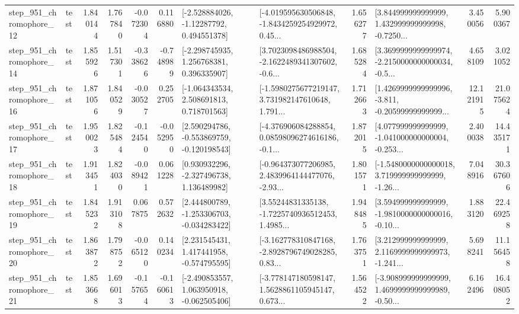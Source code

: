 \begin{tabular}{llrrrrllrlrr}
  step\_951\_chromophore\_12 &      test &      1.840144 &    1.767840 &     -0.072304 &  0.116880 &    [-2.528884026, -1.12287792, 0.494551378] &  [-4.019595630506848, -1.8434259254929972, 0.45... &       1.656277 &  [3.844999999999999, 1.432999999999998, -0.7250... &            3.450056 &          5.900367 \\
  step\_951\_chromophore\_14 &      test &      1.855926 &    1.517301 &     -0.338626 & -0.748989 &    [-2.298745935, 1.256768381, 0.396335907] &  [3.7023098486988504, -2.1622489341307602, -0.6... &       1.685284 &  [3.3699999999999974, -2.2150000000000034, -0.5... &            4.658109 &          3.021052 \\
  step\_951\_chromophore\_16 &      test &      1.871056 &    1.840529 &     -0.030527 &  0.252705 &    [-1.064343534, 2.508691813, 0.718701563] &  [-1.5980275677219147, 3.731982147610648, 1.791... &       1.712663 &  [1.4269999999999996, -3.811, -0.20599999999999... &           12.121915 &         21.075624 \\
  step\_951\_chromophore\_17 &      test &      1.950023 &    1.825484 &     -0.124540 & -0.052950 &   [2.590294786, -0.553869759, -0.120198543] &  [-4.376906084288854, 0.08598096274616186, -0.1... &       1.872015 &  [4.077999999999999, -1.041000000000004, -0.253... &            2.400038 &         14.435171 \\
  step\_951\_chromophore\_18 &      test &      1.913451 &    1.824030 &     -0.089421 &  0.061228 &    [0.930932296, -2.327496738, 1.136489982] &  [-0.964373077206985, 2.4839964144477076, -2.93... &       1.801571 &  [-1.5480000000000018, 3.719999999999999, -1.26... &            7.048916 &         30.367606 \\
  step\_951\_chromophore\_19 &      test &      1.845232 &    1.913108 &      0.067875 &  0.572632 &   [2.444800789, -1.253306703, -0.034283422] &  [3.55244831335138, -1.7225740936512453, 1.4985... &       1.948485 &  [3.594999999999999, -1.9810000000000016, -0.10... &            1.883120 &         22.469258 \\
  step\_951\_chromophore\_20 &      test &      1.863872 &    1.798752 &     -0.065120 &  0.140234 &    [2.231545431, 1.417441958, -0.574795595] &  [-3.162778310847168, -2.8928796749028285, 0.83... &       1.763751 &  [3.212999999999999, 2.1169999999999973, -1.241... &            5.698241 &         11.156458 \\
  step\_951\_chromophore\_21 &      test &      1.853668 &    1.696013 &     -0.157654 & -0.160613 &   [-2.490853557, 1.063950918, -0.062505406] &  [-3.778147180598147, 1.5628861105945147, 0.673... &       1.564522 &  [-3.908999999999999, 1.4699999999999989, -0.50... &            6.162496 &         16.408052 \\

\end{tabular}
